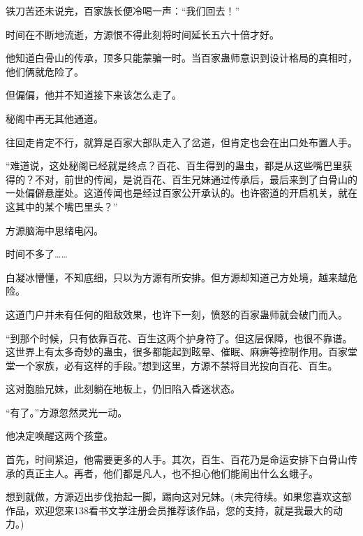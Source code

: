 \begin{this_body}
铁刀苦还未说完，百家族长便冷喝一声：“我们回去！”

时间在不断地流逝，方源恨不得此刻将时间延长五六十倍才好。

他知道白骨山的传承，顶多只能蒙骗一时。当百家蛊师意识到设计格局的真相时，他们俩就危险了。

但偏偏，他并不知道接下来该怎么走了。

秘阁中再无其他通道。

往回走肯定不行，就算是百家大部队走入了岔道，但肯定也会在出口处布置人手。

“难道说，这处秘阁已经就是终点？百花、百生得到的蛊虫，都是从这些嘴巴里获得的？不对，前世的传闻，是说百花、百生兄妹通过传承后，最后来到了白骨山的一处偏僻悬崖处。这道传闻也是经过百家公开承认的。也许密道的开启机关，就在这其中的某个嘴巴里头？”

方源脑海中思绪电闪。

时间不多了……

白凝冰懵懂，不知底细，只以为方源有所安排。但方源却知道己方处境，越来越危险。

这道门户并未有任何的阻敌效果，也许下一刻，愤怒的百家蛊师就会破门而入。

“到那个时候，只有依靠百花、百生这两个护身符了。但这层保障，也很不靠谱。这世界上有太多奇妙的蛊虫，很多都能起到眩晕、催眠、麻痹等控制作用。百家堂堂一个家族，必有这样的手段。”想到这里，方源不禁将目光投向百花、百生。

这对胞胎兄妹，此刻躺在地板上，仍旧陷入昏迷状态。

“有了。”方源忽然灵光一动。

他决定唤醒这两个孩童。

首先，时间紧迫，他需要更多的人手。其次，百生、百花乃是命运安排下白骨山传承的真正主人。再者，他们都是凡人，也不担心他们能闹出什么幺蛾子。

想到就做，方源迈出步伐抬起一脚，踢向这对兄妹。(未完待续。如果您喜欢这部作品，欢迎您来138看书文学注册会员推荐该作品，您的支持，就是我最大的动力。)

\end{this_body}

